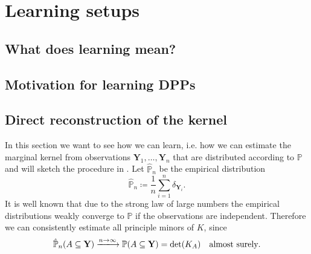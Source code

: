 \chapter{Learning setups}

\section{What does learning mean?}

\section{Motivation for learning DPPs}

\section{Direct reconstruction of the kernel}

In this section we want to see how we can learn, i.e. how we can estimate the marginal kernel from observations \(\mathbf Y_1, \dots, \mathbf Y_n\) that are distributed according to \(\mathbb P\) and will sketch the procedure in \cite{urschel2017learning}. Let \(\hat{\mathbb P}_n\) be the empirical distribution
\[\hat{\mathbb P}_n \coloneqq \frac1n\sum_{i=1}^n\delta_{\mathbf Y_i}.\]
It is well known that due to the strong law of large numbers the empirical distributions weakly converge to \(\mathbb P\) if the observations are independent. Therefore we can consistently estimate all principle minors of \(K\), since
\[\hat{\mathbb P}_n(A\subseteq \mathbf Y) \xlongrightarrow{n\to\infty} \mathbb P(A\subseteq\mathbf Y) = \det(K_A) \quad \text{almost surely}.\]

